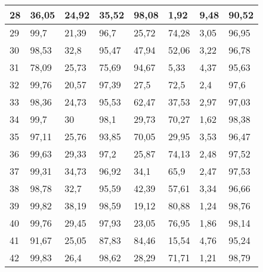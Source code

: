 \begin{longtable}[c]{|l|l|l|l|l|l|l|l|}
28              & 36,05        & 24,92        & 35,52       & 98,08         & 1,92          & 9,48          & 90,52         \\ \hline
29              & 99,7         & 21,39        & 96,7        & 25,72         & 74,28         & 3,05          & 96,95         \\ \hline
30              & 98,53        & 32,8         & 95,47       & 47,94         & 52,06         & 3,22          & 96,78         \\ \hline
31              & 78,09        & 25,73        & 75,69       & 94,67         & 5,33          & 4,37          & 95,63         \\ \hline
32              & 99,76        & 20,57        & 97,39       & 27,5          & 72,5          & 2,4           & 97,6          \\ \hline
33              & 98,36        & 24,73        & 95,53       & 62,47         & 37,53         & 2,97          & 97,03         \\ \hline
34              & 99,7         & 30           & 98,1        & 29,73         & 70,27         & 1,62          & 98,38         \\ \hline
35              & 97,11        & 25,76        & 93,85       & 70,05         & 29,95         & 3,53          & 96,47         \\ \hline
36              & 99,63        & 29,33        & 97,2        & 25,87         & 74,13         & 2,48          & 97,52         \\ \hline
37              & 99,31        & 34,73        & 96,92       & 34,1          & 65,9          & 2,47          & 97,53         \\ \hline
38              & 98,78        & 32,7         & 95,59       & 42,39         & 57,61         & 3,34          & 96,66         \\ \hline
39              & 99,82        & 38,19        & 98,59       & 19,12         & 80,88         & 1,24          & 98,76         \\ \hline
40              & 99,76        & 29,45        & 97,93       & 23,05         & 76,95         & 1,86          & 98,14         \\ \hline
41              & 91,67        & 25,05        & 87,83       & 84,46         & 15,54         & 4,76          & 95,24         \\ \hline
42              & 99,83        & 26,4         & 98,62       & 28,29         & 71,71         & 1,21          & 98,79         \\ \hline

\end{longtable}
